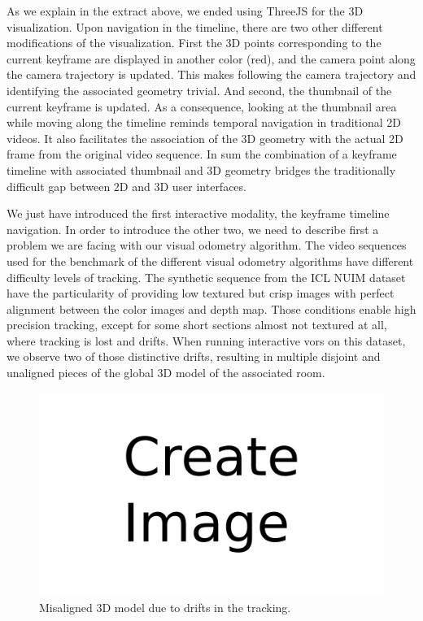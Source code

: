 As we explain in the extract above,
we ended using ThreeJS for the 3D visualization.
Upon navigation in the timeline, there are two other different modifications of the visualization.
First the 3D points corresponding to the current keyframe are displayed in another color (red),
and the camera point along the camera trajectory is updated.
This makes following the camera trajectory and identifying the associated geometry trivial.
And second, the thumbnail of the current keyframe is updated.
As a consequence, looking at the thumbnail area while moving along the timeline
reminds temporal navigation in traditional 2D videos.
It also facilitates the association of the 3D geometry with the actual 2D frame
from the original video sequence.
In sum the combination of a keyframe timeline with associated thumbnail
and 3D geometry bridges the traditionally difficult gap between 2D and 3D user interfaces.

We just have introduced the first interactive modality, the keyframe timeline navigation.
In order to introduce the other two, we need to describe first
a problem we are facing with our visual odometry algorithm.
The video sequences used for the benchmark of the different visual odometry algorithms
have different difficulty levels of tracking.
The synthetic sequence from the ICL NUIM dataset
have the particularity of providing low textured but crisp images with perfect alignment
between the color images and depth map.
Those conditions enable high precision tracking, except for some short sections
almost not textured at all, where tracking is lost and drifts.
When running interactive vors on this dataset,
we observe two of those distinctive drifts, resulting in multiple
disjoint and unaligned pieces of the global 3D model of the associated room.

\begin{figure}[h]
	\centering
	\includegraphics[width=\linewidth]{assets/img/todo.png}
	\caption{Misaligned 3D model due to drifts in the tracking.}%
	\label{fig:drift_icl_nuim}
\end{figure}

